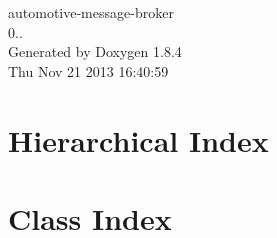 \documentclass[twoside]{book}
\newcommand{\clearemptydoublepage}{%
  \newpage{\pagestyle{empty}\cleardoublepage}%
}
\begin{document}
\hypersetup{pageanchor=false}
\begin{titlepage}
\vspace*{7cm}
\begin{center}%
{\Large automotive-\/message-\/broker \\[1ex]\large 0.. }\\
\vspace*{1cm}
{\large Generated by Doxygen 1.8.4}\\
\vspace*{0.5cm}
{\small Thu Nov 21 2013 16:40:59}\\
\end{center}
\end{titlepage}
\clearemptydoublepage
\tableofcontents
\clearemptydoublepage
{}
\hypersetup{pageanchor=true}

\chapter{Hierarchical Index}

\chapter{Class Index}

\end{document}
